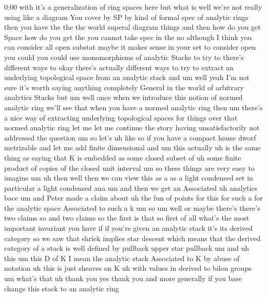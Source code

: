 \begin{unfinished}{0:00}
with  it's  a  generalization  of  ring
spaces  here  but  what  is
well  we're  not  really  using  like  a
diagram  You  cover  by  SP  by  kind  of
formal  spec  of  analytic  rings  then  you
have  the  the  the  world  superal  diagram
things  and  then  how  do  you  get  Space  how
do  you  get
the  you  cannot  take  spec  in  the  no
although  I  think  you  can  consider  all
open  substat  maybe  it  makes  sense  in
your  set  to  consider  open  you  could  you
could  use  monomorphisms  of  analytic
Stacks  to  try  to  there's  different  ways
to  okay  there's  actually  different  ways
to  try  to  extract  an  underlying
topological  space  from  an  analytic  stack
and
um
well  yeah  I'm  not  sure  it's  worth  saying
anything  completely  General  in  the  world
of  arbitrary  analytics  Stacks  but  um
well  once  when  we  introduce  this  notion
of  normed  analytic  ring  we'll  see  that
when  you  have  a  normed  analytic  ring
then  um  there's  a  nice  way  of  extracting
underlying  topological  spaces  for  things
over  that  normed  analytic  ring  let  me
let  me  continue  the  story  having
unsatisfactorily  not  addressed  the
question  um  so  let's  uh  like  so  if  you
have  a  compact  house  dworf
metrizable  and  let  me  add  finite
dimensional  and  um  this  actually  uh  is
the  same  thing  as  saying  that  K  is
embedded  as  some  closed  subset  of  uh
some  finite  product  of  copies  of  the
closed  unit  interval  um  so  these  things
are  very  easy  to  imagine
um  uh  then  well  then  we  can  view  this  as
a  as  a  light  condensed  set  in  particular
a  light  condensed  ana  um  and  then  we  get
an  Associated  uh  analytics
bace  um  and  Peter  made  a  claim  about  uh
the  fun  of  points  for  this  for  such  a
for  the  analytic  space  Associated  to
such  a  k
um
so
um  well  or  maybe  there's  there's  two
claims  so  and  two
claims  so  the  first  is  that  so  first  of
all  what's  the  most  important  invariant
you  have  if  if  you're  given  an  analytic
stack  it's  its  derived  category  so  we
saw  that  shriek  implies  star  descent
which  means  that  the  derived  category  of
a  stack  is  well  defined  by  pullback
upper  star  pullback  um  and  uh  this  um
this  D  of  K  I  mean  the  analytic  stack
Associated  to  K  by  abuse  of
notation  uh  this  is  just  sheaves  on
K  uh  with  values  in  derived  to  bilon
groups
um  what's
that  uh  thank  you  yes  thank
you  and  more  generally  if  you  base
change  this  stack  to  an  analytic  ring

\end{unfinished}

